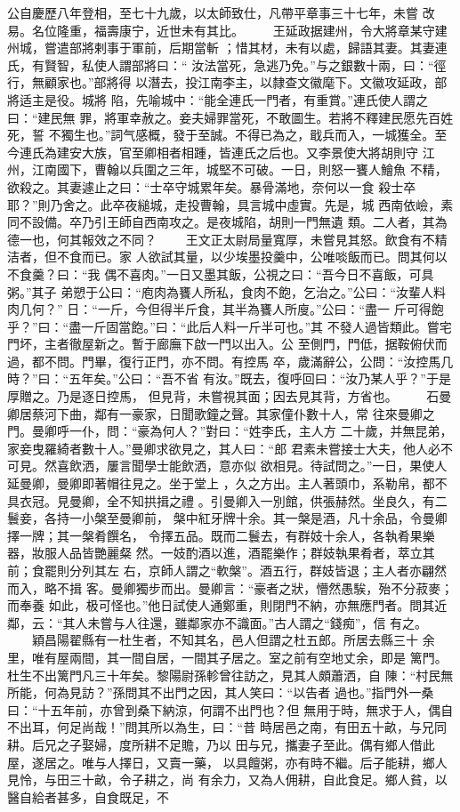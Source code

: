 \documentclass{ctexart}
\begin{document}
公自慶歷八年登相，至七十九歲，以太師致仕，凡帶平章事三十七年，未嘗 改易。名位隆重，福壽康宁，近世未有其比。 　　王延政据建州，令大將章某守建州城，嘗遣部將剌事于軍前，后期當斬 ；惜其材，未有以處，歸語其妻。其妻連氏，有賢智，私使人謂部將曰：`` 汝法當死，急逃乃免。''与之銀數十兩，曰：``徑行，無顧家也。''部將得 以潛去，投江南李主，以隸查文徽麾下。文徽攻延政，部將适主是役。城將 陷，先喻城中：``能全連氏一門者，有重賞。''連氏使人謂之曰：``建民無 罪，將軍幸赦之。妾夫婦罪當死，不敢圖生。若將不釋建民愿先百姓死，誓 不獨生也。''詞气感概，發于至誠。不得已為之，戢兵而入，一城獲全。至 今連氏為建安大族，官至卿相者相踵，皆連氏之后也。又李景使大將胡則守 江州，江南國下，曹翰以兵圍之三年，城堅不可破。一日，則怒一饔人鱠魚 不精，欲殺之。其妻遽止之曰：``士卒守城累年矣。暴骨滿地，奈何以一食 殺士卒耶？''則乃舍之。此卒夜縋城，走投曹翰，具言城中虛實。先是，城 西南依嶮，素同不設備。卒乃引王師自西南攻之。是夜城陷，胡則一門無遺 類。二人者，其為德一也，何其報效之不同？ 　　王文正太尉局量寬厚，未嘗見其怒。飲食有不精洁者，但不食而已。家 人欲試其量，以少埃墨投羹中，公唯啖飯而已。問其何以不食羹？曰：``我 偶不喜肉。''一日又墨其飯，公視之曰：``吾今日不喜飯，可具粥。''其子 弟愬于公曰：``庖肉為饔人所私，食肉不飽，乞治之。''公曰：``汝輩人料 肉几何？'' 日：``一斤，今但得半斤食，其半為饔人所廋。''公曰：``盡一 斤可得飽乎？''曰：``盡一斤固當飽。''曰：``此后人料一斤半可也。''其 不發人過皆類此。嘗宅門坏，主者徹屋新之。暫于廊廡下啟一門以出入。公 至側門，門低，据鞍俯伏而過，都不問。門畢，復行正門，亦不問。有控馬 卒，歲滿辭公，公問：``汝控馬几時？''曰：``五年矣。''公曰：``吾不省 有汝。''既去，復呼回曰：``汝乃某人乎？''于是厚贈之。乃是逐日控馬， 但見背，未嘗視其面；因去見其背，方省也。 　　石曼卿居蔡河下曲，鄰有一豪家，日聞歌鐘之聲。其家僮仆數十人，常 往來曼卿之門。曼卿呼一仆，問：``豪為何人？''對曰：``姓李氏，主人方 二十歲，并無昆弟，家妾曳羅綺者數十人。''曼卿求欲見之，其人曰：``郎 君素未嘗接士大夫，他人必不可見。然喜飲洒，屢言聞學士能飲洒，意亦似 欲相見。待試問之。''一日，果使人延曼卿，曼卿即著帽往見之。坐于堂上 ，久之方出。主人著頭巾，系勒帛，都不具衣冠。見曼卿，全不知拱揖之禮 。引曼卿入一別館，供張赫然。坐良久，有二鬟妾，各持一小槃至曼卿前， 槃中紅牙牌十余。其一槃是酒，凡十余品，令曼卿擇一牌；其一槃肴饌名， 令擇五品。既而二鬟去，有群妓十余人，各執肴果樂器，妝服人品皆艷麗粲 然。一妓酌酒以進，酒罷樂作；群妓執果肴者，萃立其前；食罷則分列其左 右，京師人謂之``軟槃''。酒五行，群妓皆退；主人者亦翩然而入，略不揖 客。曼卿獨步而出。曼卿言：``豪者之狀，懵然愚騃，殆不分菽麥；而奉養 如此，极可怪也。''他日試使人通鄭重，則閉門不納，亦無應門者。問其近 鄰，云：``其人未嘗与人往還，雖鄰家亦不識面。''古人謂之``錢痴''，信 有之。 　　穎昌陽翟縣有一杜生者，不知其名，邑人但謂之杜五郎。所居去縣三十 余里，唯有屋兩間，其一間自居，一間其子居之。室之前有空地丈余，即是 篱門。杜生不出篱門凡三十年矣。黎陽尉孫軫曾往訪之，見其人頗蕭洒，自 陳：``村民無所能，何為見訪？''孫問其不出門之因，其人笑曰：``以告者 過也。''指門外一桑曰：``十五年前，亦曾到桑下納涼，何謂不出門也？但 無用于時，無求于人，偶自不出耳，何足尚哉！''問其所以為生，曰：``昔 時居邑之南，有田五十畝，与兄同耕。后兄之子娶婦，度所耕不足贍，乃以 田与兄，攜妻子至此。偶有鄉人借此屋，遂居之。唯与人擇日，又賣一藥， 以具饘粥，亦有時不繼。后子能耕，鄉人見怜，与田三十畝，令子耕之，尚 有余力，又為人佣耕，自此食足。鄉人貧，以醫自給者甚多，自食既足，不 
\end{document}
